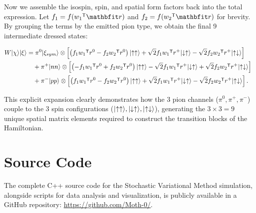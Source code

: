\documentclass[a4paper,oneside,article,12pt]{memoir}
\begin{document}
Now we assemble the isospin, spin, and spatial form factors back into the total expression. Let $f_1 = f(w_1\tr \v{r})$ and $f_2 = f(w_2\tr \v{r})$ for brevity. By grouping the terms by the emitted pion type, we obtain the final 9 intermediate dressed states:

\begin{align}
    W \ket{\chi} \ket{\xi} &= 
    \pi^0 \ket{\xi_{sym}} \otimes \br[2]{ 
        \br{f_1 w_1\tr r^0 - f_2 w_2\tr r^0} \ket{\uparrow\uparrow} 
        + \sqrt{2} f_1 w_1\tr r^+ \ket{\downarrow\uparrow} 
        - \sqrt{2} f_2 w_2\tr r^+ \ket{\uparrow\downarrow} 
    } \n
    &\quad + \pi^+ \ket{nn} \otimes \br[2]{ 
        \br{-f_1 w_1\tr r^0 + f_2 w_2\tr r^0} \ket{\uparrow\uparrow} 
        - \sqrt{2} f_1 w_1\tr r^+ \ket{\downarrow\uparrow} 
        + \sqrt{2} f_2 w_2\tr r^+ \ket{\uparrow\downarrow} 
    } \n
    &\quad + \pi^- \ket{pp} \otimes \br[2]{ 
        \br{f_1 w_1\tr r^0 - f_2 w_2\tr r^0} \ket{\uparrow\uparrow} 
        + \sqrt{2} f_1 w_1\tr r^+ \ket{\downarrow\uparrow} 
        - \sqrt{2} f_2 w_2\tr r^+ \ket{\uparrow\downarrow} 
    }.
\end{align}

This explicit expansion clearly demonstrates how the 3 pion channels ($\pi^0, \pi^+, \pi^-$) couple to the 3 spin configurations ($\lvert\uparrow\uparrow\rangle, \lvert\downarrow\uparrow\rangle, \lvert\uparrow\downarrow\rangle$), generating the $3 \times 3 = 9$ unique spatial matrix elements required to construct the transition blocks of the Hamiltonian.

\chapter{Source Code} \label{ap:code}
The complete C++ source code for the Stochastic Variational Method simulation, alongside scripts for data analysis and visualization, is publicly available in a GitHub repository: \url{https://github.com/Moth-0/}.
\end{document}
